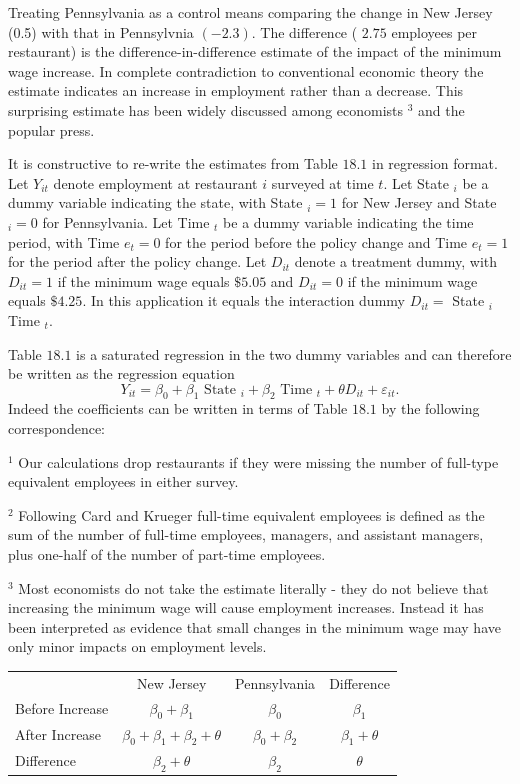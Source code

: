 \documentclass[10pt]{article}
\begin{document}
Treating Pennsylvania as a control means comparing the change in New Jersey (0.5) with that in Pennsylvnia $(-2.3)$. The difference ( $2.75$ employees per restaurant) is the difference-in-difference estimate of the impact of the minimum wage increase. In complete contradiction to conventional economic theory the estimate indicates an increase in employment rather than a decrease. This surprising estimate has been widely discussed among economists ${ }^{3}$ and the popular press.

It is constructive to re-write the estimates from Table $18.1$ in regression format. Let $Y_{i t}$ denote employment at restaurant $i$ surveyed at time $t$. Let State $_{i}$ be a dummy variable indicating the state, with State $_{i}=1$ for New Jersey and State $_{i}=0$ for Pennsylvania. Let Time ${ }_{t}$ be a dummy variable indicating the time period, with Time $e_{t}=0$ for the period before the policy change and Time $e_{t}=1$ for the period after the policy change. Let $D_{i t}$ denote a treatment dummy, with $D_{i t}=1$ if the minimum wage equals $\$ 5.05$ and $D_{i t}=0$ if the minimum wage equals $\$ 4.25$. In this application it equals the interaction dummy $D_{i t}=$ State $_{i}$ Time $_{t}$.

Table $18.1$ is a saturated regression in the two dummy variables and can therefore be written as the regression equation
$$
Y_{i t}=\beta_{0}+\beta_{1} \text { State }_{i}+\beta_{2} \text { Time }_{t}+\theta D_{i t}+\varepsilon_{i t} .
$$
Indeed the coefficients can be written in terms of Table $18.1$ by the following correspondence:

${ }^{1}$ Our calculations drop restaurants if they were missing the number of full-type equivalent employees in either survey.

${ }^{2}$ Following Card and Krueger full-time equivalent employees is defined as the sum of the number of full-time employees, managers, and assistant managers, plus one-half of the number of part-time employees.

${ }^{3}$ Most economists do not take the estimate literally - they do not believe that increasing the minimum wage will cause employment increases. Instead it has been interpreted as evidence that small changes in the minimum wage may have only minor impacts on employment levels.

\begin{tabular}{lccc}
\hline\hline
 & New Jersey & Pennsylvania & Difference \\
\cline { 2 - 4 }
Before Increase & $\beta_{0}+\beta_{1}$ & $\beta_{0}$ & $\beta_{1}$ \\
After Increase & $\beta_{0}+\beta_{1}+\beta_{2}+\theta$ & $\beta_{0}+\beta_{2}$ & $\beta_{1}+\theta$ \\
Difference & $\beta_{2}+\theta$ & $\beta_{2}$ & $\theta$ \\
\hline
\end{tabular}
\end{document}
